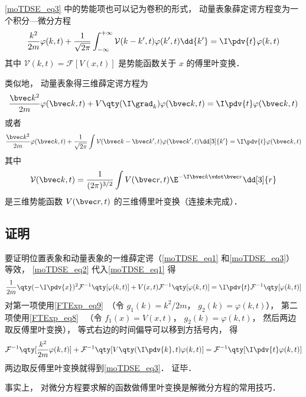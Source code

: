 \autoref{moTDSE_eq3} 中的势能项也可以记为卷积的形式， 动量表象薛定谔方程变为一个积分—微分方程
\begin{equation}\label{moTDSE_eq4}
\frac{k^2}{2m}\varphi(k, t) + \frac{1}{\sqrt{2\pi}}\int_{-\infty}^{+\infty} \mathcal{V}(k-k', t) \varphi(k', t) \dd{k'} = \I \pdv{t} \varphi(k,t)
\end{equation}
其中 $\mathcal{V}(k, t) = \mathcal{F}[V(x, t)]$ 是势能函数关于 $x$ 的傅里叶变换．

类似地， 动量表象得三维薛定谔方程为
\begin{equation}
\frac{\bvec k^2}{2m}\varphi(\bvec k, t) + V\qty(\I \grad_k)\varphi(\bvec k, t) = \I \pdv{t} \varphi(\bvec k,t)
\end{equation}
或者
\begin{equation}
\frac{\bvec k^2}{2m}\varphi(\bvec k, t) + \frac{1}{\sqrt{2\pi}}\int \mathcal{V}(\bvec k-\bvec k', t) \varphi(\bvec k', t)\dd[3]{k'} = \I \pdv{t} \varphi(\bvec k,t)
\end{equation}
其中
\begin{equation}
\mathcal{V}(\bvec k, t) = \frac{1}{(2\pi)^{3/2}} \int V(\bvec r, t) \E^{-\I \bvec k \vdot \bvec r}\dd[3]{r}
\end{equation}
是三维势能函数 $V(\bvec r, t)$ 的三维傅里叶变换（连接未完成）．

\subsection{证明}
要证明位置表象和动量表象的一维薛定谔（\autoref{moTDSE_eq1} 和\autoref{moTDSE_eq3}）等效， \autoref{moTDSE_eq2} 代入\autoref{moTDSE_eq1} 得
\begin{equation}\label{moTDSE_eq5}
\frac{1}{2m}\qty(-\I\pdv{x})^2 \mathcal{F}^{-1}\qty[\varphi(k, t)] + V(x, t)\mathcal{F}^{-1}\qty[\varphi(k, t)] = \I \pdv{t}\mathcal{F}^{-1}\qty[\varphi(k, t)]
\end{equation}
对第一项使用\autoref{FTExp_eq9}~（令 $g_1(k) = k^2/2m$， $g_2(k) = \varphi(k, t)$）， 第二项使用\autoref{FTExp_eq8}~ （令 $f_1(x) = V(x, t)$， $g_2(k) = \varphi(k, t)$， 然后两边取反傅里叶变换）， 等式右边的时间偏导可以移到方括号内， 得
\begin{equation}
\mathcal{F}^{-1}\qty[\frac{k^2}{2m}\varphi(k,t)] + \mathcal{F}^{-1}\qty[V\qty(\I \pdv{k}, t)\varphi(k,t)] = \mathcal{F}^{-1}\qty[\I \pdv{t}\varphi(k,t)]
\end{equation}
两边取反傅里叶变换就得到\autoref{moTDSE_eq3}． 证毕．

事实上， 对微分方程要求解的函数做傅里叶变换是解微分方程的常用技巧． %

